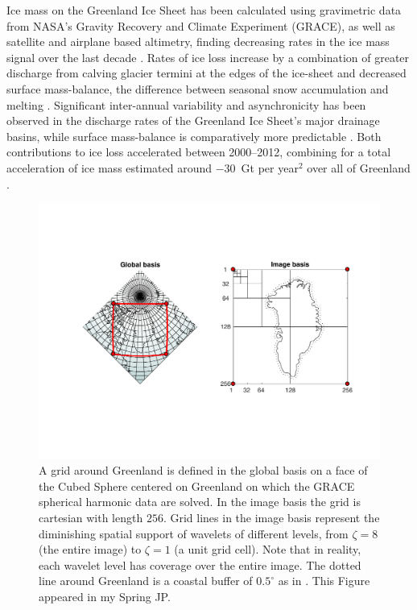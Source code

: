 \documentclass[12pt]{article}
\begin{document}
Ice mass on the Greenland Ice Sheet has been calculated using
gravimetric data from NASA's Gravity
Recovery and Climate Experiment (GRACE), as well as satellite and airplane based
altimetry, finding decreasing rates in the ice mass signal over the last
decade \cite[][]{khan2015,Harig+2016}. Rates of ice loss increase by a
combination of greater discharge from calving glacier termini at the edges of
the ice-sheet and decreased surface mass-balance, the difference between
seasonal snow accumulation and melting \cite[][]{khan2015,enderlin2014}.
Significant inter-annual variability and asynchronicity has been observed in
the discharge rates of the Greenland Ice Sheet's major drainage basins, while
surface mass-balance is comparatively more predictable
\cite[][]{mcmillan2016,enderlin2014}. Both contributions to ice loss accelerated between 2000--2012, combining for a total acceleration of ice mass
estimated around $-30$~Gt per year$^2$ over all of Greenland
\cite[][]{velicogna2009,enderlin2014}.

\begin{figure} 
\includegraphics[width=1.1\linewidth]{Figures/thegrid.pdf}
\caption[The Discrete Grid Around Greenland]{A grid around Greenland is defined in the global basis on a face of the Cubed Sphere centered on Greenland on which the GRACE spherical harmonic data are solved. In the image basis the grid is cartesian with length $256$. Grid lines in the image basis represent the diminishing spatial support of wavelets of different levels, from $\zeta=8$ (the entire image) to $\zeta=1$ (a unit grid cell). Note that in reality, each wavelet level has coverage over the entire image. The dotted line around Greenland is a coastal buffer of $0.5^{\circ}$ as in \cite{Harig+2016}. This Figure appeared in my Spring JP.} \label{fig:thegrid}
\end{figure}
\end{document}
